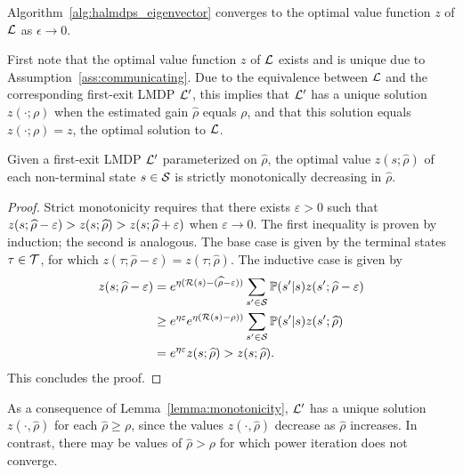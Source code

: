\begin{theorem}\label{thm:converge}
    Algorithm~\ref{alg:halmdps_eigenvector} converges to the optimal value function $z$ of $\mathcal{L}$ as $\epsilon\to 0$.
\end{theorem}

First note that the optimal value function $z$ of $\mathcal{L}$ exists and is unique due to Assumption~\ref{ass:communicating}. Due to the equivalence between $\mathcal{L}$ and the corresponding first-exit LMDP $\mathcal{L}'$, this implies that $\mathcal{L}'$ has a unique solution $z(\cdot;\rho)$ when the estimated gain $\widehat\rho$ equals $\rho$, and that this solution equals $z(\cdot;\rho)=z$, the optimal solution to $\mathcal{L}$.

\begin{lemma}\label{lemma:monotonicity}
     Given a first-exit LMDP $\mathcal{L}'$ parameterized on $\widehat\rho$, the optimal value $z(s;\widehat\rho)$ of each non-terminal state $s\in\mathcal{S}$ is strictly monotonically decreasing in $\widehat\rho$.
\end{lemma}

\begin{proof}
Strict monotonicity requires that there exists $\varepsilon>0$ such that $\linebreak{z(s;\widehat\rho - \varepsilon) > z(s;\widehat\rho) > z(s;\widehat\rho+\varepsilon)}$ when $\varepsilon\rightarrow 0$. The first inequality is proven by induction; the second is analogous. The base case is given by the terminal states $\tau\in\mathcal{T}$, for which $z(\tau;\widehat\rho - \varepsilon) = z(\tau;\widehat\rho)$. The inductive case is given by
\begin{align*}
    z(s;\widehat\rho-\varepsilon) &= e^{\eta(\mathcal{R}(s) - (\widehat\rho -\varepsilon))}\sum_{s'\in\mathcal{S}}\mathbb{P}(s'\lvert s) z(s';\widehat\rho- \varepsilon)\\
      &\geq e^{\eta\varepsilon} e^{\eta(\mathcal{R}(s) - \rho))}\sum_{s'\in\mathcal{S}}\mathbb{P}(s'\lvert s) z(s';\widehat\rho)\\
      &= e^{\eta\varepsilon} z(s;\widehat\rho) > z(s;\widehat\rho).
\end{align*}
This concludes the proof.
\end{proof}

As a consequence of Lemma~\ref{lemma:monotonicity}, $\mathcal{L}'$ has a unique solution $z(\cdot,\widehat\rho)$ for each $\widehat\rho\geq\rho$, since the values $z(\cdot,\widehat\rho)$ decrease as $\widehat\rho$ increases. In contrast, there may be values of $\widehat\rho>\rho$ for which power iteration does not converge.

